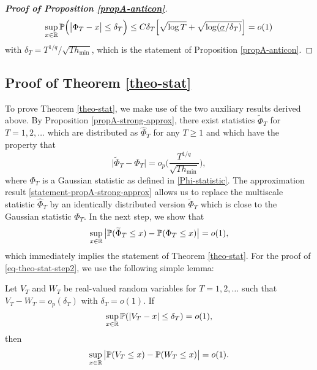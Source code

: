 \documentclass[a4paper,12pt]{article}
\numberwithin{equation}{section}
\begin{document}
\begin{proof}[\textnormal{\textbf{Proof of Proposition \ref{propA-anticon}}}]
\[ \sup_{x \in \mathbb{R}} \mathbb{P} \Big( \big| \Phi_T - x \big| \le \delta_T \Big) \le C \delta_T \Big[ \sqrt{\log T} + \sqrt{ \log(\underline{\sigma}/\delta_T) } \Big] = o(1) \]
with $\delta_T = T^{1/q} / \sqrt{T h_{\min}}$, which is the statement of Proposition \ref{propA-anticon}.
\end{proof}



\newpage
\subsection*{Proof of Theorem \ref{theo-stat}}


To prove Theorem \ref{theo-stat}, we make use of the two auxiliary results derived above. By Proposition \ref{propA-strong-approx}, there exist statistics $\widetilde{\Phi}_T$ for $T = 1,2,\ldots$ which are distributed as $\widehat{\Phi}_T$ for any $T \ge 1$ and which have the property that 
\begin{equation}\label{statement-propA-strong-approx}
\big| \widetilde{\Phi}_T - \Phi_T \big| = o_p \Big( \frac{T^{1/q}}{\sqrt{T h_{\min}}} \Big), 
\end{equation}
where $\Phi_T$ is a Gaussian statistic as defined in \eqref{Phi-statistic}. The approximation result \eqref{statement-propA-strong-approx} allows us to replace the multiscale statistic $\widehat{\Phi}_T$ by an identically distributed version $\widetilde{\Phi}_T$ which is close to the Gaussian statistic $\Phi_T$. In the next step, we show that  
\begin{equation}\label{eq-theo-stat-step2}
\sup_{x \in \mathbb{R}} \big| \mathbb{P}(\widetilde{\Phi}_T \le x) - \mathbb{P}(\Phi_T \le x) \big| = o(1), 
\end{equation}
which immediately implies the statement of Theorem \ref{theo-stat}. For the proof of \eqref{eq-theo-stat-step2}, we use the following simple lemma: 
\begin{lemmaA}\label{lemma1-theo-stat}
Let $V_T$ and $W_T$ be real-valued random variables for $T = 1,2,\ldots$ such that $V_T - W_T = o_p(\delta_T)$ with $\delta_T = o(1)$. If 
\begin{equation}\label{eq-lemma1-cond}
\sup_{x \in \mathbb{R}} \mathbb{P}(|V_T - x| \le \delta_T) = o(1), 
\end{equation}
then 
\begin{equation}\label{eq-lemma1-statement}
\sup_{x \in \mathbb{R}} \big| \mathbb{P}(V_T \le x) - \mathbb{P}(W_T \le x) \big| = o(1). 
\end{equation}
\end{lemmaA}
\end{document}

